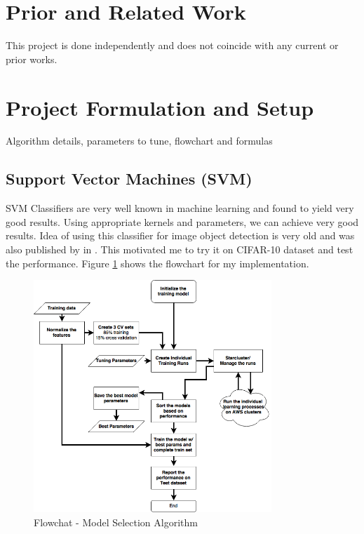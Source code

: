 \documentclass[12pt]{article}
\begin{document}
\section{Prior and Related Work}
This project is done independently and does not coincide with any current or prior works.




\section{Project Formulation and Setup}
Algorithm details, parameters to tune, flowchart and formulas

\subsection{Support Vector Machines (SVM)}
SVM Classifiers are very well known in machine learning and found to yield very good results. Using appropriate kernels and parameters, we can achieve very good results. Idea of using this classifier for image object detection is very old and was also published by \citet{ref:hog} in \citeyear{ref:hog}. This motivated me to try it on CIFAR-10 dataset and test the performance. Figure \ref{img:flowchart_learning} shows the flowchart for my implementation. 

\begin{figure}[H]
\centering
%
\includegraphics[width=0.8\textwidth]{images/flowchart_learning.png} 
\caption{Flowchat - Model Selection Algorithm}
\label{img:flowchart_learning}
\end{figure}
\end{document}
